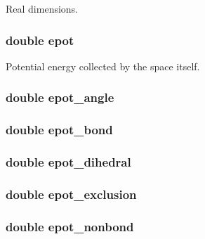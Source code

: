 Real dimensions. \hypertarget{structspace_a3e050eccabbd5322482d7f63e45f038d}{
\subsubsection[{epot}]{\setlength{\rightskip}{0pt plus 5cm}double epot}}\label{structspace_a3e050eccabbd5322482d7f63e45f038d}
Potential energy collected by the space itself. \hypertarget{structspace_a13161f6f83303cc16b2f447181f82e59}{
\subsubsection[{epot\-\_\-angle}]{\setlength{\rightskip}{0pt plus 5cm}double epot\-\_\-angle}}\label{structspace_a13161f6f83303cc16b2f447181f82e59}
\hypertarget{structspace_a7f960eb873757cb71ba74f9575dfcc3d}{
\subsubsection[{epot\-\_\-bond}]{\setlength{\rightskip}{0pt plus 5cm}double epot\-\_\-bond}}\label{structspace_a7f960eb873757cb71ba74f9575dfcc3d}
\hypertarget{structspace_aab31fcdff2c60c9ccdda04ce05779152}{
\subsubsection[{epot\-\_\-dihedral}]{\setlength{\rightskip}{0pt plus 5cm}double epot\-\_\-dihedral}}\label{structspace_aab31fcdff2c60c9ccdda04ce05779152}
\hypertarget{structspace_a97dac668d1649b9ce547e6831444de48}{
\subsubsection[{epot\-\_\-exclusion}]{\setlength{\rightskip}{0pt plus 5cm}double epot\-\_\-exclusion}}\label{structspace_a97dac668d1649b9ce547e6831444de48}
\hypertarget{structspace_a6ed20d960a8500fd893f49042778b87d}{
\subsubsection[{epot\-\_\-nonbond}]{\setlength{\rightskip}{0pt plus 5cm}double epot\-\_\-nonbond}}\label{structspace_a6ed20d960a8500fd893f49042778b87d}
